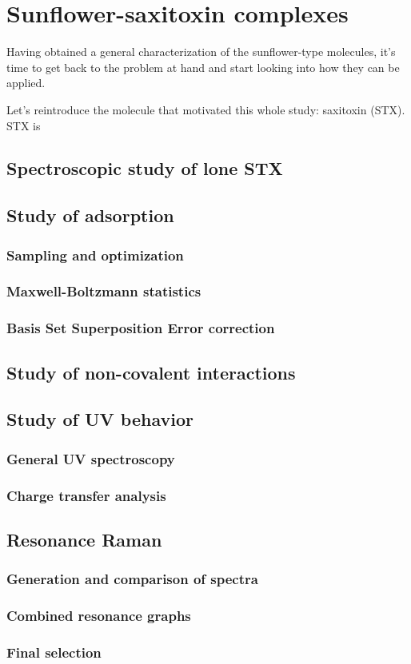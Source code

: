 \chapter{Sunflower-saxitoxin complexes}

Having obtained a general characterization of the sunflower-type molecules, it's time to get back to the problem at hand and start looking into how they can be applied.

Let's reintroduce the molecule that motivated this whole study: saxitoxin (STX).
STX is

\section{Spectroscopic study of lone STX}

\section{Study of adsorption}
\blindtext
\subsection{Sampling and optimization}
\blindtext
\subsection{Maxwell-Boltzmann statistics}
\blindtext
\subsection{Basis Set Superposition Error correction}
\blindtext

\section{Study of non-covalent interactions}
\blindtext

\section{Study of UV behavior}
\blindtext
\subsection{General UV spectroscopy}
\blindtext
\subsection{Charge transfer analysis}
\blindtext

\section{Resonance Raman}
\blindtext
\subsection{Generation and comparison of spectra}
\blindtext
\subsection{Combined resonance graphs}
\blindtext
\subsection{Final selection}
\blindtext
